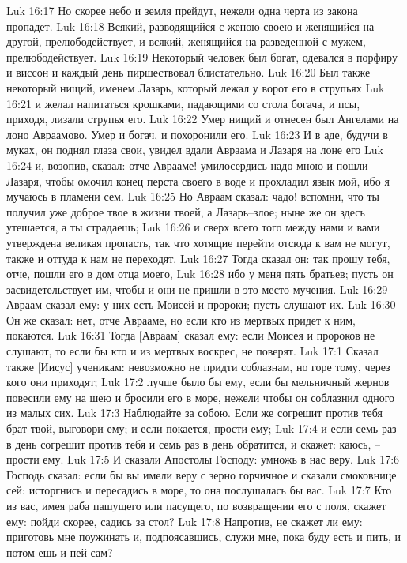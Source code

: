 Luk 16:17  Но скорее небо и земля прейдут, нежели одна черта из закона пропадет.
Luk 16:18  Всякий, разводящийся с женою своею и женящийся на другой, прелюбодействует, и всякий, женящийся на разведенной с мужем, прелюбодействует.
Luk 16:19  Некоторый человек был богат, одевался в порфиру и виссон и каждый день пиршествовал блистательно.
Luk 16:20  Был также некоторый нищий, именем Лазарь, который лежал у ворот его в струпьях
Luk 16:21  и желал напитаться крошками, падающими со стола богача, и псы, приходя, лизали струпья его.
Luk 16:22  Умер нищий и отнесен был Ангелами на лоно Авраамово. Умер и богач, и похоронили его.
Luk 16:23  И в аде, будучи в муках, он поднял глаза свои, увидел вдали Авраама и Лазаря на лоне его
Luk 16:24  и, возопив, сказал: отче Аврааме! умилосердись надо мною и пошли Лазаря, чтобы омочил конец перста своего в воде и прохладил язык мой, ибо я мучаюсь в пламени сем.
Luk 16:25  Но Авраам сказал: чадо! вспомни, что ты получил уже доброе твое в жизни твоей, а Лазарь--злое; ныне же он здесь утешается, а ты страдаешь;
Luk 16:26  и сверх всего того между нами и вами утверждена великая пропасть, так что хотящие перейти отсюда к вам не могут, также и оттуда к нам не переходят.
Luk 16:27  Тогда сказал он: так прошу тебя, отче, пошли его в дом отца моего,
Luk 16:28  ибо у меня пять братьев; пусть он засвидетельствует им, чтобы и они не пришли в это место мучения.
Luk 16:29  Авраам сказал ему: у них есть Моисей и пророки; пусть слушают их.
Luk 16:30  Он же сказал: нет, отче Аврааме, но если кто из мертвых придет к ним, покаются.
Luk 16:31  Тогда [Авраам] сказал ему: если Моисея и пророков не слушают, то если бы кто и из мертвых воскрес, не поверят.
Luk 17:1  Сказал также [Иисус] ученикам: невозможно не придти соблазнам, но горе тому, через кого они приходят;
Luk 17:2  лучше было бы ему, если бы мельничный жернов повесили ему на шею и бросили его в море, нежели чтобы он соблазнил одного из малых сих.
Luk 17:3  Наблюдайте за собою. Если же согрешит против тебя брат твой, выговори ему; и если покается, прости ему;
Luk 17:4  и если семь раз в день согрешит против тебя и семь раз в день обратится, и скажет: каюсь, --прости ему.
Luk 17:5  И сказали Апостолы Господу: умножь в нас веру.
Luk 17:6  Господь сказал: если бы вы имели веру с зерно горчичное и сказали смоковнице сей: исторгнись и пересадись в море, то она послушалась бы вас.
Luk 17:7  Кто из вас, имея раба пашущего или пасущего, по возвращении его с поля, скажет ему: пойди скорее, садись за стол?
Luk 17:8  Напротив, не скажет ли ему: приготовь мне поужинать и, подпоясавшись, служи мне, пока буду есть и пить, и потом ешь и пей сам?

